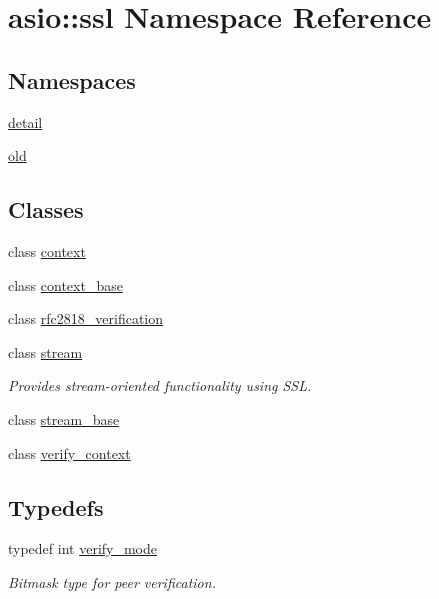 \hypertarget{namespaceasio_1_1ssl}{}\section{asio\+:\+:ssl Namespace Reference}
\label{namespaceasio_1_1ssl}
\subsection*{Namespaces}
\begin{DoxyCompactItemize}
\item 
 \hyperlink{namespaceasio_1_1ssl_1_1detail}{detail}
\item 
 \hyperlink{namespaceasio_1_1ssl_1_1old}{old}
\end{DoxyCompactItemize}
\subsection*{Classes}
\begin{DoxyCompactItemize}
\item 
class \hyperlink{classasio_1_1ssl_1_1context}{context}
\item 
class \hyperlink{classasio_1_1ssl_1_1context__base}{context\+\_\+base}
\item 
class \hyperlink{classasio_1_1ssl_1_1rfc2818__verification}{rfc2818\+\_\+verification}
\item 
class \hyperlink{classasio_1_1ssl_1_1stream}{stream}
\begin{DoxyCompactList}\small\item\em Provides stream-\/oriented functionality using S\+S\+L. \end{DoxyCompactList}\item 
class \hyperlink{classasio_1_1ssl_1_1stream__base}{stream\+\_\+base}
\item 
class \hyperlink{classasio_1_1ssl_1_1verify__context}{verify\+\_\+context}
\end{DoxyCompactItemize}
\subsection*{Typedefs}
\begin{DoxyCompactItemize}
\item 
typedef int \hyperlink{namespaceasio_1_1ssl_aa6497e51bc608f2397a731a14f80b563}{verify\+\_\+mode}
\begin{DoxyCompactList}\small\item\em Bitmask type for peer verification. \end{DoxyCompactList}\end{DoxyCompactItemize}
